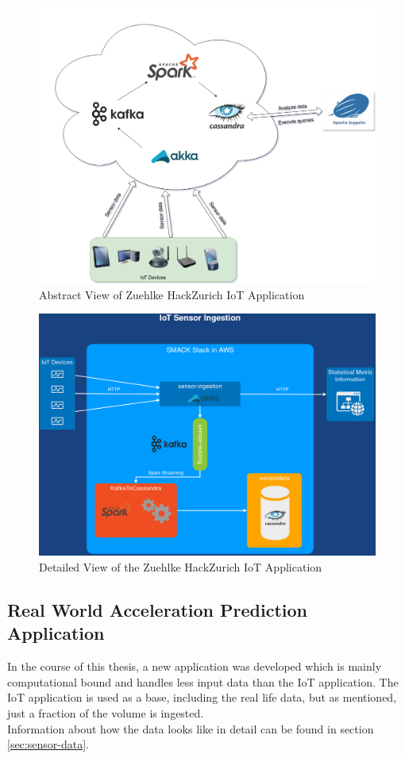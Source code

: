 \begin{figure}[!htbp]
  \centering
  \includegraphics[keepaspectratio=true,scale=0.38]{img/hackzurich}
    \caption{Abstract View of Zuehlke HackZurich IoT Application}
  \label{fig:hackzurich}
\end{figure}

\begin{figure}[!htbp]
  \centering
  \includegraphics[keepaspectratio=true,scale=0.35]{img/IoT}
    \caption{Detailed View of the Zuehlke HackZurich IoT Application}
  \label{fig:iot}
\end{figure}


\subsection{Real World Acceleration Prediction Application}
\label{sec:computation_application}
In the course of this thesis, a new application was developed which is mainly computational bound and handles less input data than the IoT application.
The IoT application is used as a base, including the real life data, but as mentioned, just a fraction of the volume is ingested.\\
Information about how the data looks like in detail can be found in section \ref{sec:sensor-data}.\\

